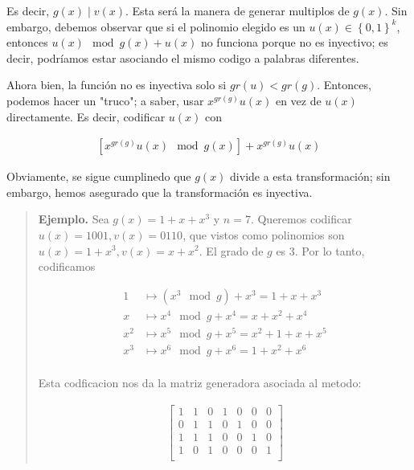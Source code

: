 \documentclass[a4paper]{article}
\begin{document}
Es decir, $g(x) \mid v(x)$. Esta será la manera de generar multiplos de $g(x)$.
Sin embargo, debemos observar que si el polinomio elegido es un $u(x) \in
\left\{ 0, 1 \right\}^k $, entonces $u(x) \mod g(x) + u(x)$ no funciona porque
no es inyectivo; es decir, podríamos estar asociando el mismo codigo a palabras
diferentes. 

Ahora bien, la función no es inyectiva solo si $gr(u) < gr(g)$. Entonces, podemos 
hacer un "truco"; a saber, usar $x^{gr(g)} u(x)$ en vez de $u(x)$ directamente. Es decir, 
codificar $u(x)$ con 

\begin{align*}
    \left[x^{gr(g)} u(x) \mod g(x)\right] + x^{gr(g)}u(x)
\end{align*}

Obviamente, se sigue cumplinedo que $g(x)$ divide a esta transformación; sin embargo,
hemos asegurado que la transformación es inyectiva.


\small
\begin{quote}

\textbf{Ejemplo.} Sea $g(x) = 1 + x + x^3$ y $n = 7$. Queremos codificar $u(x) = 1001, v(x) = 0110$,
que vistos como polinomios son $u(x) = 1 + x^3, v(x) = x + x^2$. El grado de $g$ es $3$.
Por lo tanto, codificamos 

\begin{align*}
    1 &\mapsto (x^3 \mod g) + x^3 = 1 + x + x^3 \\ 
    x &\mapsto  x^4 \mod g + x^4 = x + x^2 + x^4\\
    x^2 &\mapsto  x^5 \mod g + x^5 = x^2 + 1 + x + x^5\\
    x^3 &\mapsto  x^6 \mod g + x^6 = 1 + x^2 + x^6\\
\end{align*}

Esta codficacion nos da la matriz generadora asociada al metodo:

\begin{align*}
    \begin{bmatrix} 
        1 & 1 & 0 & 1 & 0 & 0 & 0 \\ 
        0 & 1 & 1 & 0 & 1 & 0 & 0 \\ 
        1 & 1 & 1 & 0 & 0 & 1 & 0 \\ 
        1 & 0 & 1 & 0 & 0 & 0 & 1 \\ 
    \end{bmatrix} 
\end{align*}


\end{quote}
\normalsize
\end{document}
